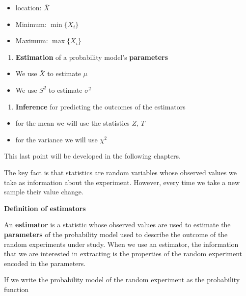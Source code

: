 \documentclass[
]{book}
\providecommand{\tightlist}{%
  \setlength{\itemsep}{0pt}\setlength{\parskip}{0pt}}
\begin{document}
\begin{itemize}
\tightlist
\item
  location: \(\bar{X}\)
\item
  Minimum: \(\min\{X_i\}\)
\item
  Maximum: \(\max\{X_i\}\)
\end{itemize}

\begin{enumerate}
\def\labelenumi{\arabic{enumi}.}
\setcounter{enumi}{1}
\tightlist
\item
  \textbf{Estimation} of a probability model's \textbf{parameters}
\end{enumerate}

\begin{itemize}
\tightlist
\item
  We use \(\bar{X}\) to estimate \(\mu\)
\item
  We use \(S^2\) to estimate \(\sigma^2\)
\end{itemize}

\begin{enumerate}
\def\labelenumi{\arabic{enumi}.}
\setcounter{enumi}{2}
\tightlist
\item
  \textbf{Inference} for predicting the outcomes of the estimators
\end{enumerate}

\begin{itemize}
\tightlist
\item
  for the mean we will use the statistics \(Z\), \(T\)
\item
  for the variance we will use \(\chi^2\)
\end{itemize}

This last point will be developed in the following chapters.

The key fact is that statistics are random variables whose observed values we take as information about the experiment. However, every time we take a new sample their value change.

\textbf{Definition of estimators}

An \textbf{estimator} is a statistic whose observed values are used to estimate the \textbf{parameters} of the probability model used to describe the outcome of the random experiments under study. When we use an estimator, the information that we are interested in extracting is the properties of the random experiment encoded in the parameters.

If we write the probability model of the random experiment as the probability function
\end{document}
